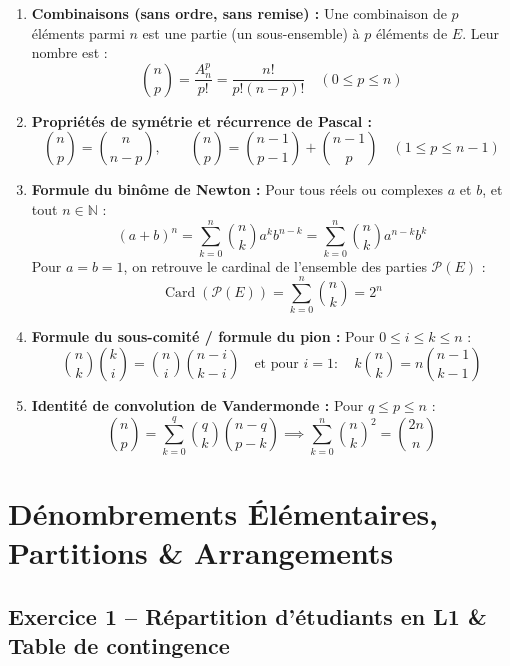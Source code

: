 \documentclass[11pt,a4paper]{article}
\newcommand{\N}{\mathbb{N}}
\begin{document}
\begin{coursbox}
\begin{enumerate}
    \item \textbf{Combinaisons (sans ordre, sans remise) :} Une combinaison de $p$ éléments parmi $n$ est une partie (un sous-ensemble) à $p$ éléments de $E$. Leur nombre est :
    \[
    \binom{n}{p} = \frac{A_n^p}{p!} = \frac{n!}{p!(n-p)!} \quad (0 \le p \le n)
    \]
    \item \textbf{Propriétés de symétrie et récurrence de Pascal :}
    \[
    \binom{n}{p} = \binom{n}{n-p}, \qquad \binom{n}{p} = \binom{n-1}{p-1} + \binom{n-1}{p} \quad (1 \le p \le n-1)
    \]
    \item \textbf{Formule du binôme de Newton :} Pour tous réels ou complexes $a$ et $b$, et tout $n \in \N$ :
    \[
    (a + b)^n = \sum_{k=0}^n \binom{n}{k} a^k b^{n-k} = \sum_{k=0}^n \binom{n}{k} a^{n-k} b^k
    \]
    Pour $a = b = 1$, on retrouve le cardinal de l'ensemble des parties $\mathscr{P}(E)$ :
    \[
    \operatorname{Card}(\mathscr{P}(E)) = \sum_{k=0}^n \binom{n}{k} = 2^n
    \]
    \item \textbf{Formule du sous-comité / formule du pion :} Pour $0 \le i \le k \le n$ :
    \[
    \binom{n}{k} \binom{k}{i} = \binom{n}{i} \binom{n-i}{k-i} \quad \text{et pour } i = 1 : \quad k \binom{n}{k} = n \binom{n-1}{k-1}
    \]
    \item \textbf{Identité de convolution de Vandermonde :} Pour $q \le p \le n$ :
    \[
    \binom{n}{p} = \sum_{k=0}^q \binom{q}{k} \binom{n-q}{p-k} \implies \sum_{k=0}^n \binom{n}{k}^2 = \binom{2n}{n}
    \]
\end{enumerate}
\end{coursbox}

\vspace{0.4cm}

\section{Dénombrements Élémentaires, Partitions \& Arrangements}

\subsection*{Exercice 1 -- Répartition d'étudiants en L1 \& Table de contingence}
\end{document}

